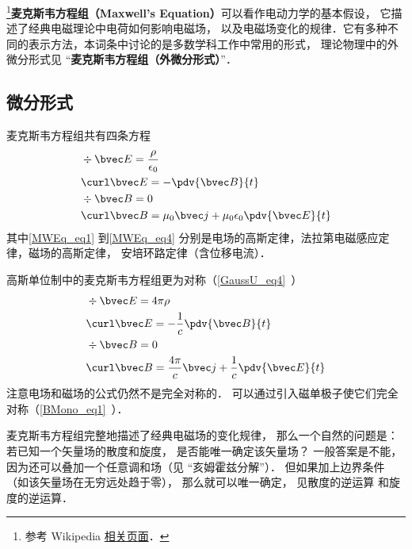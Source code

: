 
\begin{issues}
\end{issues}


\footnote{参考 Wikipedia \href{https://en.wikipedia.org/wiki/Maxwell's_equations}{相关页面}．}\textbf{麦克斯韦方程组（Maxwell's Equation）}可以看作电动力学的基本假设， 它描述了经典电磁理论中电荷如何影响电磁场， 以及电磁场变化的规律．它有多种不同的表示方法，本词条中讨论的是多数学科工作中常用的形式， 理论物理中的外微分形式见 “\textbf{麦克斯韦方程组（外微分形式）}”．

\subsection{微分形式}
麦克斯韦方程组共有四条方程
\begin{align}\label{MWEq_eq1}
&\div \bvec E = \frac{\rho}{\epsilon_0}\\
\label{MWEq_eq2}
&\curl \bvec E = -\pdv{\bvec B}{t}\\
\label{MWEq_eq3}
&\div \bvec B = 0\\
\label{MWEq_eq4}
&\curl \bvec B = \mu_0 \bvec j + \mu_0\epsilon_0 \pdv{\bvec E}{t}
\end{align}
其中\autoref{MWEq_eq1} 到\autoref{MWEq_eq4} 分别是电场的高斯定律，法拉第电磁感应定律，磁场的高斯定律， 安培环路定律（含位移电流）．

高斯单位制中的麦克斯韦方程组更为对称（\autoref{GaussU_eq4}~）
\begin{equation}
\begin{aligned}
&\div \bvec E = 4\pi\rho\\
&\curl \bvec E = -\frac{1}{c}\pdv{\bvec B}{t}\\
&\div \bvec B = 0 \\
&\curl \bvec B = \frac{4\pi}{c} \bvec j + \frac{1}{c}\pdv{\bvec E}{t}
\end{aligned}
\end{equation}
注意电场和磁场的公式仍然不是完全对称的． 可以通过引入磁单极子使它们完全对称（\autoref{BMono_eq1}~）．

麦克斯韦方程组完整地描述了经典电磁场的变化规律， 那么一个自然的问题是： 若已知一个矢量场的散度和旋度， 是否能唯一确定该矢量场？ 一般答案是不能， 因为还可以叠加一个任意调和场（见 “亥姆霍兹分解”）． 但如果加上边界条件（如该矢量场在无穷远处趋于零）， 那么就可以唯一确定， 见散度的逆运算 和旋度的逆运算．


